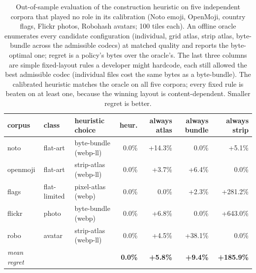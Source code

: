 \documentclass[3p,twocolumn]{elsarticle}
\begin{document}
\begin{table}[t]
\centering
\footnotesize
\setlength{\tabcolsep}{4pt}
\begin{tabular}{@{}lll rrrr@{}}
\toprule
corpus & class & heuristic choice & heur. & always atlas & always bundle & always strip \\
\midrule
noto & flat-art & byte-bundle (webp-ll) & 0.0\% & +14.3\% & 0.0\% & +5.1\% \\
openmoji & flat-art & strip-atlas (webp-ll) & 0.0\% & +3.7\% & +6.4\% & 0.0\% \\
flags & flat-limited & pixel-atlas (webp) & 0.0\% & 0.0\% & +2.3\% & +281.2\% \\
flickr & photo & byte-bundle (webp) & 0.0\% & +6.8\% & 0.0\% & +643.0\% \\
robo & avatar & strip-atlas (webp-ll) & 0.0\% & +4.5\% & +38.1\% & 0.0\% \\
\midrule
\textit{mean regret} &  &  & \textbf{0.0\%} & \textbf{+5.8\%} & \textbf{+9.4\%} & \textbf{+185.9\%} \\
\bottomrule
\end{tabular}
\caption{Out-of-sample evaluation of the construction heuristic
on five independent corpora that played no role in its calibration (Noto
emoji, OpenMoji, country flags, Flickr photos, Robohash avatars; 100
tiles each). An offline oracle enumerates every candidate configuration
(individual, grid atlas, strip atlas, byte-bundle across the admissible
codecs) at matched quality and reports the byte-optimal one; regret is a
policy's bytes over the oracle's. The
last three columns are simple fixed-layout rules a developer might
hardcode, each still allowed the best admissible codec (individual files
cost the same bytes as a byte-bundle). The calibrated heuristic matches
the oracle on all five corpora; every fixed rule is beaten on at least
one, because the winning layout is content-dependent. Smaller regret is
better.}

\end{table}
\end{document}
